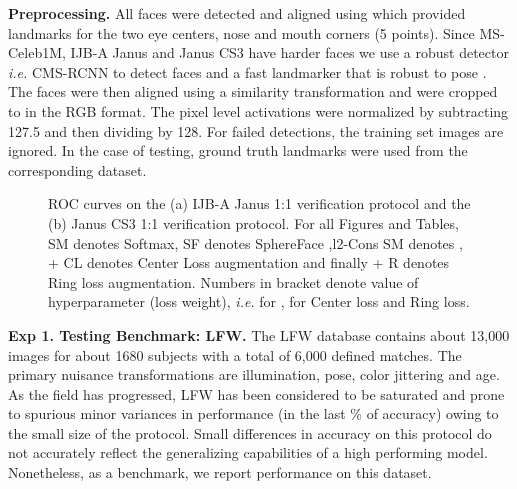 \documentclass[10pt,twocolumn,letterpaper]{article}
\begin{document}
 






\textbf{Preprocessing.} All faces were detected and aligned using \cite{zhang2016joint} which provided landmarks for the two eye centers, nose and mouth corners (5 points). Since MS-Celeb1M, IJB-A Janus and Janus CS3 have harder faces we use a robust detector \emph{i.e.} CMS-RCNN \cite{zhu2017cms} to detect faces and a fast landmarker that is robust to pose \cite{bhagavatula2017faster}. The faces were then aligned using a similarity transformation and were cropped to  in the RGB format. The pixel level activations were normalized by subtracting 127.5 and then dividing by 128. For failed detections, the training set images are ignored. In the case of testing, ground truth landmarks were used from the corresponding dataset.











\begin{figure*}\begin{center}
        
    \end{center}
    \vspace{-0.5cm}
\caption{ ROC curves on the (a) IJB-A Janus 1:1 verification protocol and the (b) Janus CS3 1:1 verification protocol. For all Figures and Tables, SM denotes Softmax, SF denotes SphereFace \cite{liu2017sphereface},l2-Cons SM denotes \cite{ranjan2017l2}, + CL denotes Center Loss augmentation \cite{wen2016discriminative} and finally + R denotes Ring loss augmentation. Numbers in bracket denote value of hyperparameter (loss weight), \emph{i.e.}  for \cite{ranjan2017l2},  for Center loss and Ring loss.}
\vspace{-0.5cm}
\end{figure*}












\textbf{Exp 1. Testing Benchmark: LFW.} The LFW \cite{LFWTech} database contains about 13,000 images for about 1680 subjects with a total of 6,000 defined matches. The primary nuisance transformations are illumination, pose, color jittering and age. As the field has progressed, LFW has been considered to be saturated and prone to spurious minor variances in performance (in the last \% of accuracy) owing to the small size of the protocol. Small differences in accuracy on this protocol do not accurately reflect the generalizing capabilities of a high performing model. Nonetheless, as a benchmark, we report performance on this dataset.
\end{document}
